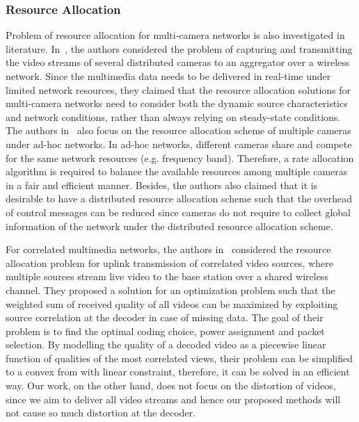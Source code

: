 \subsubsection{Resource Allocation}
Problem of resource allocation for multi-camera networks is also investigated in literature.
%
In~\cite{MWSNresourceAllocation}, the authors considered the problem of capturing and transmitting the video streams of several distributed cameras to an aggregator  over a wireless network.
Since the multimedia data needs to be delivered in real-time under limited network resources, they claimed that the resource allocation solutions for multi-camera networks need to consider both the dynamic source characteristics and network conditions, rather than always relying on steady-state conditions.
%
The authors in~\cite{rateAllocationForVideo} also focus on the resource allocation scheme of multiple cameras under ad-hoc networks.
In ad-hoc networks, different cameras share and compete for the same network resources (e.g. frequency band).
Therefore, a rate allocation algorithm is required to balance the available resources among multiple cameras in a fair and efficient manner.
Besides, the authors also claimed that it is desirable to have a distributed resource allocation scheme such that the overhead of control messages can be reduced since cameras do not require to collect global information of the network under the distributed resource allocation scheme.
%

For correlated multimedia networks, the authors in~\cite{AdaptiveCrossLayerRA} considered the resource allocation problem for uplink transmission of correlated video sources, where multiple sources stream live video to the base station over a shared wireless channel.
They proposed a solution for an optimization problem such that the weighted sum of
received quality of all videos can be maximized by exploiting source correlation at the decoder in case of missing data.
The goal of their problem is to find the optimal coding choice, power assignment and packet selection.
By modelling the quality of a decoded video as a piecewise linear function of qualities of the most correlated views, their problem can be simplified to a convex from with linear constraint, therefore, it can be solved in an efficient way.
Our work, on the other hand, does not focus on the distortion of videos, since we aim to deliver all video streams and hence our proposed methods will not cause so much distortion at the decoder.
%
